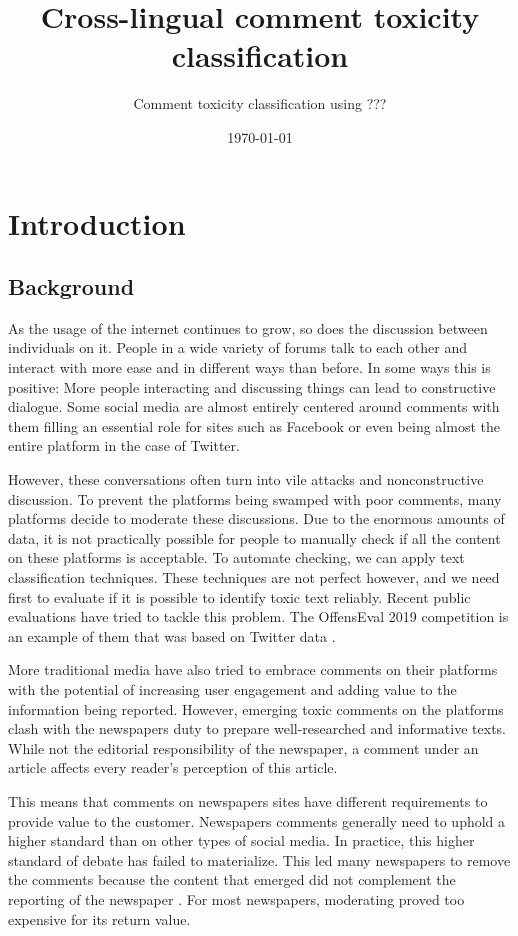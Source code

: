 \documentclass[nofilelist]{cslthse-msc}
\title{Cross-lingual comment toxicity classification}
\subtitle{Comment toxicity classification using ???}
\date{\today}
\begin{document}
\renewcommand{\bibname}{References}

\makefrontmatter
\chapter[Introduction]{Introduction}
\section{Background}
As the usage of the internet continues to grow, so does the discussion between individuals on it. People in a wide variety of forums talk to each other and interact with more ease and in different ways than before. In some ways this is positive: More people interacting and discussing things can lead to constructive dialogue. Some social media are almost entirely centered around comments with them filling an essential role for sites such as Facebook or even being almost the entire platform in the case of Twitter. 

However, these conversations often turn into vile attacks and nonconstructive discussion. To prevent the platforms being swamped with poor comments, many platforms decide to moderate these discussions.  Due to the enormous amounts of data, it is not practically possible for people to manually check if all the content on these platforms is acceptable. To automate checking, we can apply text classification techniques. These techniques are not perfect however, and we need first to evaluate if it is possible to identify toxic text reliably. Recent public evaluations have tried to tackle this problem. The OffensEval 2019 competition is an example of them that was based on Twitter data \citep{zampieri2019semeval}.

More traditional media have also tried to embrace comments on their platforms with the potential of increasing user engagement and adding value to the information being reported. However, emerging toxic comments on the platforms clash with the newspapers duty to prepare well-researched and informative texts. While not the editorial responsibility of the newspaper, a comment under an article  affects every reader's perception of this article. 

This means that comments on newspapers sites have different requirements to provide value to the customer. Newspapers comments  generally need to uphold a higher standard than on other types of social media. In practice, this higher standard of debate has failed to materialize. This led many newspapers to remove the comments because the content that emerged did not complement the reporting of the newspaper \citep{trygg2012comment}. For most newspapers, moderating proved too expensive for its return value.
\end{document}
